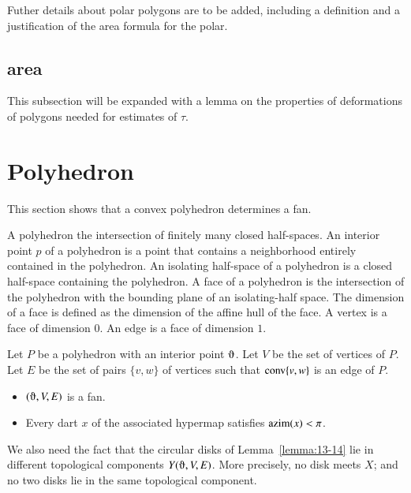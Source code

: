 \begin{note}%
Futher details about polar polygons are to be added, including a definition and a justification of the area formula for the polar.
\end{note}


\subsection{area}

\begin{note}%
This subsection will be expanded with a lemma on the properties of  deformations of polygons needed for estimates of $\tau$.
\end{note}


\section{Polyhedron}

This section shows that a convex polyhedron determines a fan.

\begin{definition}
A polyhedron the intersection of finitely many closed half-spaces.
An interior point $p$ of a polyhedron is a point that contains a neighborhood
entirely contained in the polyhedron. An isolating half-space of
a polyhedron is a closed half-space containing the polyhedron.  A face of a polyhedron
is the intersection of the polyhedron with the bounding plane of an isolating-half space.   The dimension of a face is defined as the dimension of the affine hull of the face.  A vertex is a face of dimension $0$.  An edge is a face of dimension $1$.
\end{definition}

\begin{lemma}\label{lemma:polyhedron}  
Let $P$ be a polyhedron with an interior point $\orgn$.
Let $V$ be the set of vertices of $P$.  Let $E$ be the set of pairs $\{v,w\}$
of vertices such that ${\operatorname{conv}}\{v,w\}$ is an edge of $P$.
\begin{itemize}
\item $(\orgn,V,E)$ is a fan.
\item Every dart $x$ of the associated hypermap satisfies ${\operatorname{azim}}(x)<\pi$.
\end{itemize}
\end{lemma}


\begin{note}%
We also need the fact that the circular disks of Lemma~\ref{lemma:13-14} lie in different topological components $Y(\orgn,V,E)$.  More precisely, no disk meets $X$; and no two disks lie in the same topological component.
\end{note}


